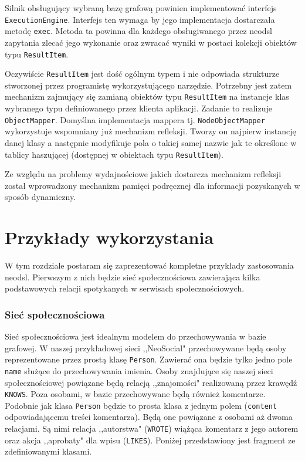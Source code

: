 \documentclass[brudnopis]{xmgr}
\begin{document}
Silnik obsługujący wybraną bazę grafową powinien implementować interfejs \texttt{ExecutionEngine}. Interfejs ten wymaga by jego implementacja dostarczała metodę \texttt{exec}. Metoda ta powinna dla każdego obsługiwanego przez neodsl zapytania zlecać jego wykonanie oraz zwracać wyniki w postaci kolekcji obiektów typu \texttt{ResultItem}.

Oczywiście \texttt{ResultItem} jest dość ogólnym typem i nie odpowiada strukturze stworzonej przez programistę wykorzystującego narzędzie. Potrzebny jest zatem mechanizm zajmujący się zamianą obiektów typu \texttt{ResultItem} na instancje klas wybranego typu definiowanego przez klienta aplikacji. Zadanie to realizuje \texttt{ObjectMapper}. Domyślna implementacja mappera tj. \texttt{NodeObjectMapper} wykorzystuje wspomniany już mechanizm refleksji. Tworzy on najpierw instancję danej klasy a następnie modyfikuje pola o takiej samej nazwie jak te określone w tablicy haszującej (dostępnej w obiektach typu \texttt{ResultItem}).

Ze względu na problemy wydajnościowe jakich dostarcza mechanizm refleksji został wprowadzony mechanizm pamięci podręcznej dla informacji pozyskanych w sposób dynamiczny.

\chapter{Przykłady wykorzystania}

W tym rozdziale postaram się zaprezentować kompletne przykłady zastosowania neodsl. Pierwszym z nich będzie sieć społecznościowa zawierająca kilka podstawowych relacji spotykanych w serwisach społecznościowych.

\subsection{Sieć społecznościowa}

Sieć społecznościowa jest idealnym modelem do przechowywania w bazie grafowej. W naszej przykładowej sieci ,,NeoSocial" przechowywane będą osoby reprezentowane przez prostą klasę \texttt{Person}. Zawierać ona będzie tylko jedno pole \texttt{name} służące do przechowywania imienia. Osoby znajdujące się naszej sieci społecznościowej powiązane będą relacją ,,znajomości" realizowaną przez krawędź \texttt{KNOWS}. Poza osobami, w bazie przechowywane będą również komentarze. Podobnie jak klasa \texttt{Person} będzie to prosta klasa z jednym polem (\texttt{content} odpowiadającemu treści komentarza). Będą one powiązane z osobami aż dwoma relacjami. Są nimi relacja ,,autorstwa" (\texttt{WROTE}) wiążąca komentarz z jego autorem oraz akcja ,,aprobaty" dla wpisu (\texttt{LIKES}). Poniżej przedstawiony jest fragment ze zdefiniowanymi klasami.
\end{document}
